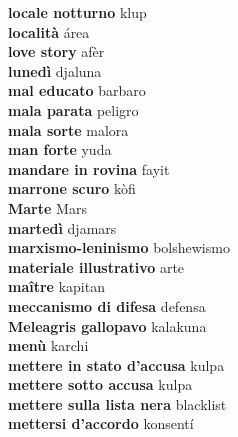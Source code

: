 \textbf{ locale notturno  } klup \\
\textbf{ località  } área \\
\textbf{ love story  } afèr \\
\textbf{ lunedì  } djaluna \\
\textbf{ mal educato  } barbaro \\
\textbf{ mala parata  } peligro \\
\textbf{ mala sorte  } malora \\
\textbf{ man forte  } yuda \\
\textbf{ mandare in rovina  } fayit \\
\textbf{ marrone scuro  } kòfi \\
\textbf{ Marte  } Mars \\
\textbf{ martedì  } djamars \\
\textbf{ marxismo-leninismo  } bolshewismo \\
\textbf{ materiale illustrativo  } arte \\
\textbf{ maître  } kapitan \\
\textbf{ meccanismo di difesa  } defensa \\
\textbf{ Meleagris gallopavo  } kalakuna \\
\textbf{ menù  } karchi \\
\textbf{ mettere in stato d’accusa  } kulpa \\
\textbf{ mettere sotto accusa  } kulpa \\
\textbf{ mettere sulla lista nera  } blacklist \\
\textbf{ mettersi d’accordo  } konsentí \\
